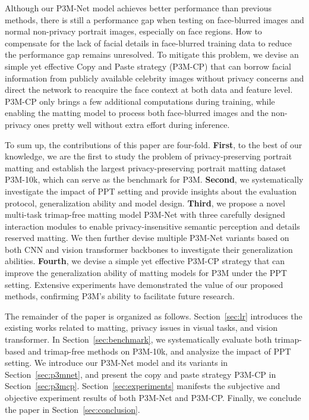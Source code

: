 \documentclass[twocolumn]{svjour3}
\begin{document}
Although our P3M-Net model achieves better performance than previous methods, there is still a performance gap when testing on face-blurred images and normal non-privacy portrait images, especially on face regions.  How to compensate for the lack of facial details in face-blurred training data to reduce the performance gap remains unresolved. To mitigate this problem, we devise an simple yet effective Copy and Paste strategy (P3M-CP) that can borrow facial information from publicly available celebrity images without privacy concerns and direct the network to reacquire the face context at both data and feature level. P3M-CP only brings a few additional computations during training, while enabling the matting model to process both face-blurred images and the non-privacy ones pretty well without extra effort during inference.

To sum up, the contributions of this paper are four-fold. \textbf{First}, to the best of our knowledge, we are the first to study the problem of privacy-preserving portrait matting and establish the largest privacy-preserving portrait matting dataset P3M-10k, which can serve as the benchmark for P3M. \textbf{Second}, we systematically investigate the impact of PPT setting and provide insights about the evaluation protocol, generalization ability and model design. \textbf{Third}, we propose a novel multi-task trimap-free matting model P3M-Net with three carefully designed interaction modules to enable privacy-insensitive semantic perception and details reserved matting. We then further devise multiple P3M-Net variants based on both CNN and vision transformer backbones to investigate their generalization abilities. \textbf{Fourth}, we devise a simple yet effective P3M-CP strategy that can improve the generalization ability of matting models for P3M under the PPT setting. Extensive experiments have demonstrated the value of our proposed methods, confirming P3M's ability to facilitate future research.

The remainder of the paper is organized as follows. Section~\ref{sec:lr} introduces the existing works related to matting, privacy issues in visual tasks, and vision transformer. In Section~\ref{sec:benchmark}, we systematically evaluate both trimap-based and trimap-free methods on P3M-10k, and analysize the impact of PPT setting. We introduce our P3M-Net model and its variants in Section~\ref{sec:p3mnet}, and present the copy and paste strategy P3M-CP in Section~\ref{sec:p3mcp}. Section~\ref{sec:experiments} manifests the subjective and objective experiment results of both P3M-Net and P3M-CP. Finally, we conclude the paper in Section~\ref{sec:conclusion}.
\end{document}
